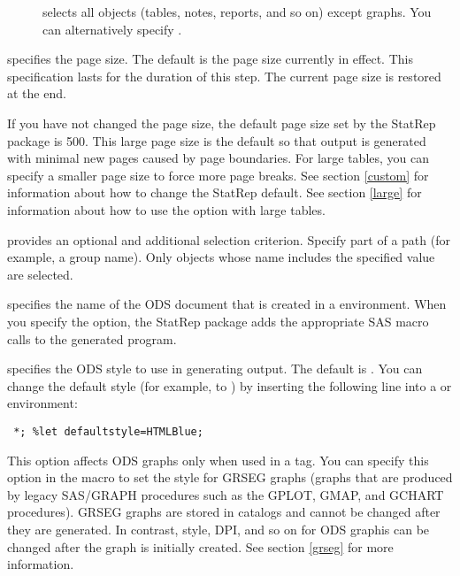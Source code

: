 \documentclass[article,oneside]{memoir}
\newcommand*{\StatRep}{\textsf{StatRep}\xspace}
\begin{document}
\begin{description}
\begin{description}
  \item[] selects all objects
  (tables, notes, reports, and so on) except graphs. You can
  alternatively specify .

  \end{description}

  \item[\Code{pagesize=}] specifies the page size. The default is the page size currently in effect.
  This specification lasts for the
  duration of this step. The current page size is restored at the end.

  If you have not changed the page size, the default page size set by the \StatRep
  package is 500. This large page size is the default so that output is generated with
  minimal new pages caused by page boundaries. For large tables, you can specify a smaller
  page size to force more page breaks. See section \ref{custom} for information about
  how to change the \StatRep default. See section \ref{large} for information about how
  to use the  option with large tables.

  \item[\Code{pattern=}] provides an optional and additional selection criterion.
  Specify part of a path (for example, a group name).
  Only objects whose name includes the specified value are selected.

    \item[\Code{store=}] specifies the name of the ODS document that is created in a
      environment. When you specify the  option,
     the \StatRep package adds the appropriate SAS macro calls to the
     generated program.

  \item[\Code{style=}] specifies the ODS style to use in generating output.
    The default is \mbox{}. You can change the default style
    (for example, to ) by inserting the following line into a 
    or  environment:

\begin{snugshade}
\begin{verbatim}
 *; %let defaultstyle=HTMLBlue;
\end{verbatim}
\end{snugshade}

    This option affects ODS graphs only when used in a  tag.
    You can specify this option in the  macro to set the style
    for GRSEG graphs (graphs that are produced by legacy SAS/GRAPH
    procedures such as the GPLOT, GMAP, and GCHART procedures).
    GRSEG graphs are stored in catalogs
    and cannot be changed after they are generated. In contrast,
    style, DPI, and so on for ODS graphis can be changed after the graph is initially created.
    See section \ref{grseg} for more information.


\end{description}
\end{document}
